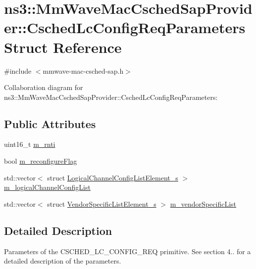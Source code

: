 \hypertarget{structns3_1_1MmWaveMacCschedSapProvider_1_1CschedLcConfigReqParameters}{}\section{ns3\+:\+:Mm\+Wave\+Mac\+Csched\+Sap\+Provider\+:\+:Csched\+Lc\+Config\+Req\+Parameters Struct Reference}
\label{structns3_1_1MmWaveMacCschedSapProvider_1_1CschedLcConfigReqParameters}


{\ttfamily \#include $<$mmwave-\/mac-\/csched-\/sap.\+h$>$}



Collaboration diagram for ns3\+:\+:Mm\+Wave\+Mac\+Csched\+Sap\+Provider\+:\+:Csched\+Lc\+Config\+Req\+Parameters\+:
\subsection*{Public Attributes}
\begin{DoxyCompactItemize}
\item 
uint16\+\_\+t \hyperlink{structns3_1_1MmWaveMacCschedSapProvider_1_1CschedLcConfigReqParameters_aa80c0915a4e36dfef7de5bda0e998314}{m\+\_\+rnti}
\item 
bool \hyperlink{structns3_1_1MmWaveMacCschedSapProvider_1_1CschedLcConfigReqParameters_a93aba9829898bd985a17bae2d7405e98}{m\+\_\+reconfigure\+Flag}
\item 
std\+::vector$<$ struct \hyperlink{structns3_1_1LogicalChannelConfigListElement__s}{Logical\+Channel\+Config\+List\+Element\+\_\+s} $>$ \hyperlink{structns3_1_1MmWaveMacCschedSapProvider_1_1CschedLcConfigReqParameters_abe93227d631415355edcb3257d0fb0e9}{m\+\_\+logical\+Channel\+Config\+List}
\item 
std\+::vector$<$ struct \hyperlink{structns3_1_1VendorSpecificListElement__s}{Vendor\+Specific\+List\+Element\+\_\+s} $>$ \hyperlink{structns3_1_1MmWaveMacCschedSapProvider_1_1CschedLcConfigReqParameters_a51e61919e1fbceaa2c9af8383d469f8a}{m\+\_\+vendor\+Specific\+List}
\end{DoxyCompactItemize}


\subsection{Detailed Description}
Parameters of the C\+S\+C\+H\+E\+D\+\_\+\+L\+C\+\_\+\+C\+O\+N\+F\+I\+G\+\_\+\+R\+EQ primitive. See section 4.. for a detailed description of the parameters. 

